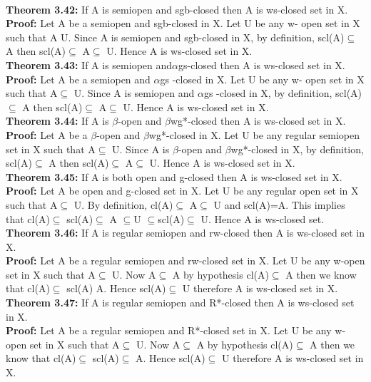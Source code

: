{{{				\\\textbf{Theorem 3.42:} If A is semiopen and sgb-closed then A is ws-closed set in X.
				\\\textbf{Proof:} Let A be a semiopen and sgb-closed in X. Let U be any w- open set in X such that A U. Since A is semiopen and sgb-closed in X, by definition, scl(A)$\subseteq$ A then scl(A)$\subseteq$ A$\subseteq$ U. Hence A is ws-closed set in X.
				\\\textbf{Theorem 3.43:} If A is semiopen and$\alpha$gs-closed then A is  ws-closed set in X.
				\\\textbf{Proof:} Let A be a semiopen and $\alpha$gs -closed in X. Let U be any w- open set in X such that A$\subseteq$ U. Since A is semiopen and $\alpha$gs -closed in X, by definition, scl(A)$\subseteq$ A then scl(A)$\subseteq$ A$\subseteq$ U. Hence A is ws-closed set in X.
				\\\textbf{Theorem 3.44:} If A is $\beta$-open and $\beta$wg*-closed then A is ws-closed set in X.
				\\\textbf{Proof:} Let A be a  $\beta$-open and $\beta$wg*-closed in X. Let U be any regular semiopen set in X such that A$\subseteq$ U. Since A is $\beta$-open and $\beta$wg*-closed in X, by definition, scl(A)$\subseteq$ A then scl(A)$\subseteq$ A$\subseteq$ U. Hence A is ws-closed set in X.
				\\\textbf{Theorem 3.45:} If A is both open and g-closed then A is ws-closed set in X.
				\\\textbf{Proof:} Let A be open and g-closed set in X. Let U be any regular open set in X such that A$\subseteq$ U. By definition, cl(A)$\subseteq$ A$\subseteq$ U and scl(A)=A. This implies that cl(A)$\subseteq$ scl(A)$\subseteq$  A $\subseteq$U $\subseteq$scl(A)$\subseteq$ U. Hence A is ws-closed set.
				\\\textbf{Theorem 3.46:} If A is regular semiopen and rw-closed then A is ws-closed set in X.
				\\\textbf{Proof:} Let A be a regular semiopen and rw-closed set in X. Let U be any w-open set in X such that A$\subseteq$ U. Now A$\subseteq$ A by hypothesis cl(A)$\subseteq$ A then we know that cl(A)$\subseteq$  scl(A) A. Hence scl(A)$\subseteq$ U therefore A is  ws-closed set in X.
				\\\textbf{Theorem 3.47:} If A is regular semiopen and R*-closed then A is ws-closed set in X.
				\\\textbf{Proof:} Let A be a regular semiopen and R*-closed set in X. Let U be any w-open set in X such that A$\subseteq$ U. Now A$\subseteq$ A by hypothesis cl(A)$\subseteq$ A then we know that cl(A)$\subseteq$  scl(A)$\subseteq$  A. Hence scl(A)$\subseteq$ U therefore A is  ws-closed set in X.
}}}
